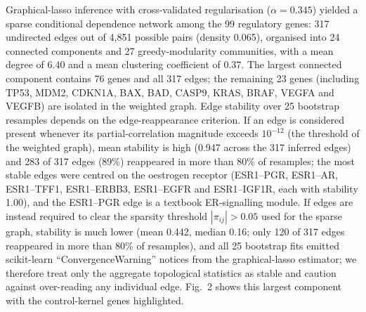 \documentclass[12pt]{article}
\begin{document}
Graphical-lasso inference with cross-validated regularisation ($\alpha =
0.345$) yielded a sparse conditional dependence network among the 99
regulatory genes: 317 undirected edges out of 4,851 possible pairs (density
0.065), organised into 24 connected components and 27 greedy-modularity
communities, with a mean degree of 6.40 and a mean clustering coefficient of
0.37. The largest connected component contains 76 genes and all 317 edges;
the remaining 23 genes (including TP53, MDM2, CDKN1A, BAX, BAD, CASP9,
KRAS, BRAF, VEGFA and VEGFB) are isolated in the weighted graph. Edge
stability over 25 bootstrap resamples depends on the edge-reappearance
criterion. If an edge is considered present whenever its partial-correlation
magnitude exceeds $10^{-12}$ (the threshold of the weighted graph), mean
stability is high (0.947 across the 317 inferred edges) and 283 of 317
edges (89\%) reappeared in more than 80\% of resamples; the most stable
edges were centred on the oestrogen receptor (ESR1--PGR, ESR1--AR,
ESR1--TFF1, ESR1--ERBB3, ESR1--EGFR and ESR1--IGF1R, each with stability
1.00), and the ESR1--PGR edge is a textbook ER-signalling module. If edges
are instead required to clear the sparsity threshold $|\pi_{ij}| > 0.05$
used for the sparse graph, stability is much lower (mean 0.442, median 0.16;
only 120 of 317 edges reappeared in more than 80\% of resamples), and all
25 bootstrap fits emitted scikit-learn ``ConvergenceWarning'' notices from
the graphical-lasso estimator; we therefore treat
only the aggregate topological statistics as stable and caution against
over-reading any individual edge. Fig.~2 shows this largest component with
the control-kernel genes highlighted.
\end{document}
